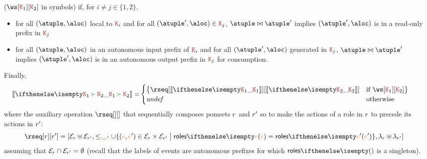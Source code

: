($\ws[\aK_1][\aK_2]$ in symbols) if, for $i \neq j \in \{1,2\}$,
%
\begin{itemize}
\item for all $(\atuple,\aloc)$ local to $\aK_i$ and for all
  $(\atuple', \aloc) \in \aK_j$, $\atuple \matches \atuple'$ implies
  $(\atuple', \aloc)$ is in a read-only prefix in $\aK_j$
\item for all $(\atuple,\aloc)$ in an autonomous input prefix of
  $\aK_i$ and for all $(\atuple', \aloc)$ generated in $\aK_j$,
  $\atuple \matches \atuple'$ implies $(\atuple',\aloc)$ is in an
  autonomous output prefix in $\aK_j$ for consumption.
\end{itemize}
%
Finally,
\begin{align*}
  \ksem{\aK_1 \seqop \aK_2} =
  &
    \begin{cases}
      \big\{
      \rseq[\ksem{\aK_1}][\ksem{\aK_2}] & \text{if } \ws[\aK_1][\aK_2]
      \big\}
      \\
      \mathit{undef} & \text{otherwise}
    \end{cases}
\end{align*}
where the auxiliary operation $\rseq[][]$ that sequentially composes
pomsets $r$ and $r'$ so to make the actions of a role in
$r$ to precede its actions in $r'$:
\[
  \rseq[\apom][\apom'] = 
  [\esetof{\apom} \uplus \esetof{\apom'},
  \leq_{\ae,\ae'} \cup \{(\ae,\ae') \in \esetof \apom \times \esetof{\apom'} \sst \roles{\ae} = \roles{\ae'}\},
  \alfof{\apom} \uplus \alfof{\apom'}]
\]
assuming that $\mathcal{E}_{r} \cap \mathcal{E}_{r'} = \emptyset$ (recall
that the labels of events are autonomous prefixes for which $\roles{}$
is a singleton).
%
%
%
%
%


